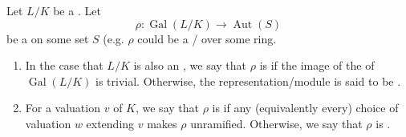 \begin{definition} \label{definition:unramified_at_a_valuation_for_a_galois_representation_or_galois_module_of_fields}
    Let $L/K$ be a . 
    Let 
    $$\rho: \operatorname{Gal}(L/K) \to \operatorname{Aut}(S)$$
    be a  on some set $S$ (e.g. $\rho$ could be a / over some ring.

    \begin{enumerate}
        \item In the case that $L/K$ is also an , we say that $\rho$ is  if the image of the  of $\operatorname{Gal}(L/K)$ is trivial. Otherwise, the representation/module is said to be .

        \item For a valuation $v$ of $K$, we say that $\rho$ is  if any (equivalently every) choice of valuation $w$ extending $v$ makes $\rho$ unramified. Otherwise, we say that $\rho$ is .
    \end{enumerate}
\end{definition}